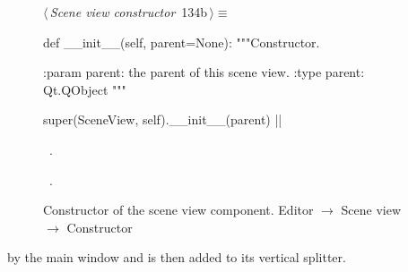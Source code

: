 \documentclass[%
    a4paper,    %
    justified,  %
    nobib,      %
    openany     %
]{tufte-book}
\makeatletter
\renewcommand{\label}[1]{\@tufte@label{##1}}%
\makeatother
\begin{document}
\begin{figure}[!htbp]
\begin{flushleft} \small
\begin{minipage}{\linewidth}\label{scrap81}\raggedright\small
{} $\langle\,${\itshape Scene view constructor}\nobreak\ {\footnotesize {134b}}$\,\rangle\equiv$
\vspace{-1ex}
\begin{pythoncode}
def __init__(self, parent=None):
    """Constructor.

    :param parent: the parent of this scene view.
    :type parent: Qt.QObject
    """

    super(SceneView, self).__init__(parent)
|\NWsep|
\end{pythoncode}
\vspace{1.5ex}
\footnotesize
\begin{list}{}{\setlength{\itemsep}{-\parsep}\setlength{\itemindent}{-\leftmargin}}
\item \NWtxtMacroDefBy\ .
\item \NWtxtMacroRefIn\ .

\item{}
\end{list}
\end{minipage}\vspace{4ex}
\end{flushleft}
\caption{Constructor of the scene view component.
  \newline{}\newline{}Editor $\rightarrow$ Scene view $\rightarrow$ Constructor}
\end{figure}

 by the main window and is then added to its
vertical splitter.
\end{document}
